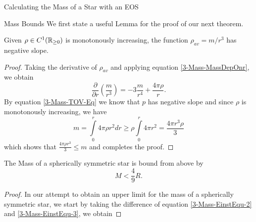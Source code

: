 \begin{section}{Calculating the Mass of a Star with an EOS}
\begin{subsection}{Mass Bounds}
We first state a useful Lemma for the proof of our next theorem.
\begin{lemma}
	Given $\rho\in C^1(\mathbb{R}_{\geq0})$ is monotonously increasing, the function $\rho_{av}=m/r^3$ has negative slope.
\end{lemma}
\begin{proof}
	Taking the derivative of $\rho_{av}$ and applying equation \ref{3-Mass-MassDepOnr}, we obtain 
	\begin{equation}
		\frac{\partial}{\partial r}\left(\frac{m}{r^3}\right) = -3\frac{m}{r^4} + \frac{4\pi\rho}{r}.
	\end{equation}
	By equation \ref{3-Mass-TOV-Eq} we know that $p$ has negative slope and since $\rho$ is monotonously increasing, we have
	\begin{equation}
		m = \int\limits_0^r 4\pi\rho r^2 dr \geq \rho\int\limits_0^r4\pi r^2 = \frac{4\pi r^3\rho}{3}
	\end{equation}
	which shows that $\frac{4\pi\rho r^3}{3}\leq m$ and completes the proof.
\end{proof}\noindent
\begin{theorem}
	The Mass of a spherically symmetric star is bound from above by
	\begin{equation}
		M < \frac{4}{9}R.
	\end{equation}
\end{theorem}
\begin{proof}
	In our attempt to obtain an upper limit for the mass of a spherically symmetric star, we start by taking the difference of equation \eqref{3-Mass-EinstEqu-2} and \eqref{3-Mass-EinstEqu-3}, we obtain 

\end{proof}
\end{subsection}
\end{section}
